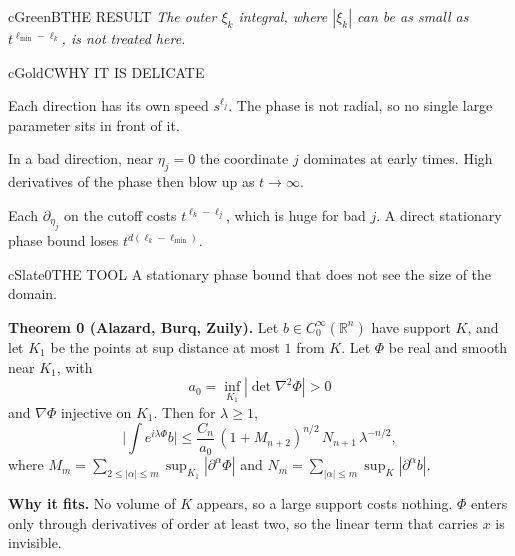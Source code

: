 \documentclass[10pt]{article}
\newcommand{\R}{\mathbb{R}}
\newcommand{\lab}[2]{\textbf{\color{#1}#2}}
\newcommand{\remk}[2]{{\color{#1}\itshape #2}}
\begin{document}
\begin{minipage}[t][49.0cm][t]{0.322\textwidth}
\begin{panel}{cGreen}{B}{THE RESULT}
\remk{cGreen}{The outer $\xi_k$ integral, where $|\xi_k|$ can be as small as
$t^{\ell_{\min}-\ell_k}$, is not treated here.}
\end{panel}
\vfill
\begin{panel}{cGold}{C}{WHY IT IS DELICATE}
\begin{rowbox}
\tcblower
Each direction has its own speed $s^{\ell_j}$. The phase is not radial, so no single large
parameter sits in front of it.
\end{rowbox}
\begin{rowbox}
\tcblower
In a bad direction, near $\eta_j=0$ the coordinate $j$ dominates at early times. High
derivatives of the phase then blow up as $t\to\infty$.
\end{rowbox}
\begin{rowbox}
\tcblower
Each $\partial_{\eta_j}$ on the cutoff costs $t^{\ell_k-\ell_j}$, which is huge for bad $j$.
A direct stationary phase bound loses $t^{d(\ell_k-\ell_{\min})}$.
\end{rowbox}
\end{panel}
\vfill
\begin{panel}{cSlate}{0}{THE TOOL}
A stationary phase bound that does not see the size of the domain.
\begin{keybox}[cSlate]
\lab{cSlate}{Theorem 0 (Alazard, Burq, Zuily).} Let $b\in C_0^\infty(\R^n)$ have support $K$,
and let $K_1$ be the points at sup distance at most $1$ from $K$. Let $\Phi$ be real and
smooth near $K_1$, with
\[
a_0=\inf_{K_1}|\det\nabla^2\Phi|>0
\]
and $\nabla\Phi$ injective on $K_1$. Then for $\lambda\ge1$,
\[
\Big|\int e^{i\lambda\Phi}b\Big|\le\frac{C_n}{a_0}\,(1+M_{n+2})^{n/2}\,N_{n+1}\,\lambda^{-n/2},
\]
where $M_m=\sum_{2\le|\alpha|\le m}\sup_{K_1}|\partial^\alpha\Phi|$ and
$N_m=\sum_{|\alpha|\le m}\sup_K|\partial^\alpha b|$.
\end{keybox}
\lab{cSlate}{Why it fits.} No volume of $K$ appears, so a large support costs nothing.
$\Phi$ enters only through derivatives of order at least two, so the linear term that
carries $x$ is invisible.


\end{panel}
\end{minipage}
\end{document}

